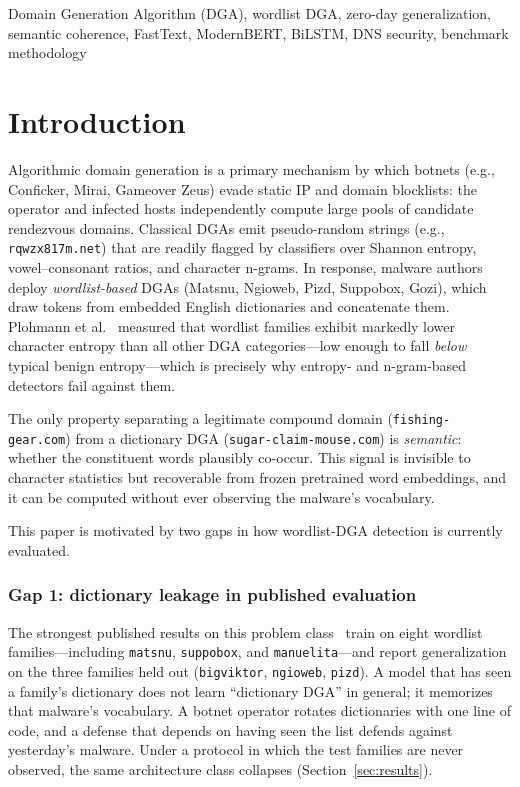 \documentclass[conference]{IEEEtran}
\begin{document}
\begin{IEEEkeywords}
Domain Generation Algorithm (DGA), wordlist DGA, zero-day generalization, semantic coherence, FastText, ModernBERT, BiLSTM, DNS security, benchmark methodology
\end{IEEEkeywords}

\section{Introduction}
Algorithmic domain generation is a primary mechanism by which botnets (e.g., Conficker, Mirai, Gameover Zeus) evade static IP and domain blocklists: the operator and infected hosts independently compute large pools of candidate rendezvous domains. Classical DGAs emit pseudo-random strings (e.g., \texttt{rqwzx817m.net}) that are readily flagged by classifiers over Shannon entropy, vowel--consonant ratios, and character n-grams. In response, malware authors deploy \emph{wordlist-based} DGAs (Matsnu, Ngioweb, Pizd, Suppobox, Gozi), which draw tokens from embedded English dictionaries and concatenate them. Plohmann et al.~\cite{plohmann2016} measured that wordlist families exhibit markedly lower character entropy than all other DGA categories---low enough to fall \emph{below} typical benign entropy---which is precisely why entropy- and n-gram-based detectors fail against them.

The only property separating a legitimate compound domain (\texttt{fishing-gear.com}) from a dictionary DGA (\texttt{sugar-claim-mouse.com}) is \emph{semantic}: whether the constituent words plausibly co-occur. This signal is invisible to character statistics but recoverable from frozen pretrained word embeddings, and it can be computed without ever observing the malware's vocabulary.

This paper is motivated by two gaps in how wordlist-DGA detection is currently evaluated.

\subsubsection*{Gap 1: dictionary leakage in published evaluation}
The strongest published results on this problem class~\cite{leyva2026} train on eight wordlist families---including \texttt{matsnu}, \texttt{suppobox}, and \texttt{manuelita}---and report generalization on the three families held out (\texttt{bigviktor}, \texttt{ngioweb}, \texttt{pizd}). A model that has seen a family's dictionary does not learn ``dictionary DGA'' in general; it memorizes that malware's vocabulary. A botnet operator rotates dictionaries with one line of code, and a defense that depends on having seen the list defends against yesterday's malware. Under a protocol in which the test families are never observed, the same architecture class collapses (Section~\ref{sec:results}).
\end{document}
